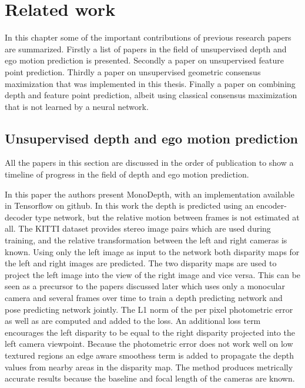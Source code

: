 \chapter{Related work}\label{cha:relatedwork}


In this chapter some of the important contributions of previous research papers are summarized. Firstly a list of papers in the field of unsupervised depth and ego motion prediction is presented. Secondly a paper on unsupervised feature point prediction. Thirdly a paper on unsupervised geometric consensus maximization that was implemented in this thesis. Finally a paper on combining depth and feature point prediction, albeit using classical consensus maximization that is not learned by a neural network.

\section{Unsupervised depth and ego motion prediction}

All the papers in this section are discussed in the order of publication to show a timeline of progress in the field of depth and ego motion prediction.


In this paper\cite{leftright} the authors present MonoDepth, with an implementation available in Tensorflow on github. In this work the depth is predicted using an encoder-decoder type network, but the relative motion between frames is not estimated at all. The KITTI dataset provides stereo image pairs which are used during training, and the relative transformation between the left and right cameras is known. Using only the left image as input to the network both disparity maps for the left and right images are predicted. The two disparity maps are used to project the left image into the view of the right image and vice versa. This can be seen as a precursor to the papers discussed later which uses only a monocular camera and several frames over time to train a depth predicting network and pose predicting network jointly. The L1 norm of the per pixel photometric error as well as \abbrSSIM\cite{ssim} are computed and added to the loss. An additional loss term encourages the left disparity to be equal to the right disparity projected into the left camera viewpoint. Because the photometric error does not work well on low textured regions an edge aware smoothess term is added to propagate the depth values from nearby areas in the disparity map. The method produces metrically accurate results because the baseline and focal length of the cameras are known.

